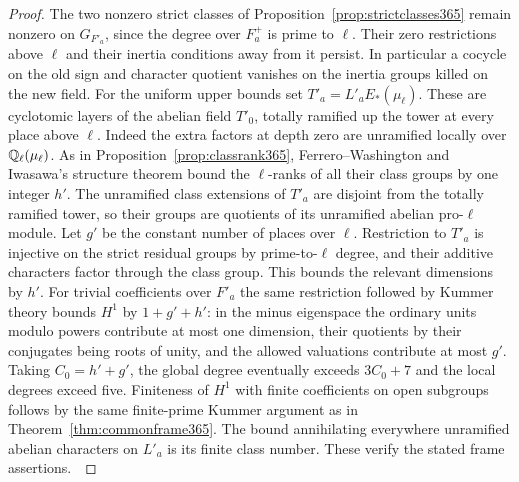 \documentclass[a4paper,11pt]{article}
\theoremstyle{definition}
\theoremstyle{remark}
\numberwithin{equation}{section}
\begin{document}
\begin{proof}
The two nonzero strict classes of Proposition~\ref{prop:strictclasses365}
remain nonzero on \(G_{F'_a}\), since the degree over \(F_a^+\)
is prime to \(\ell\). Their zero restrictions above \(\ell\)
and their inertia conditions away from it persist. In particular
a cocycle on the old sign and character quotient vanishes on
the inertia groups killed on the new field. For the uniform upper
bounds set \(T'_a=L'_aE_*(\mu_\ell)\). These are cyclotomic
layers of the abelian field \(T'_0\), totally ramified up the
tower at every place above \(\ell\). Indeed the extra factors
at depth zero are unramified locally over \(\mathbb Q_\ell(\mu_\ell)\).
As in Proposition~\ref{prop:classrank365}, Ferrero--Washington
and Iwasawa's structure theorem bound the \(\ell\)-ranks of all
their class groups by one integer \(h'\). The unramified class
extensions of \(T'_a\) are disjoint from the totally ramified
tower, so their groups are quotients of its unramified abelian
pro-\(\ell\) module. Let \(g'\) be the constant number of places
over \(\ell\). Restriction to \(T'_a\) is injective on the
strict residual groups by prime-to-\(\ell\) degree, and their
additive characters factor through the class group. This bounds
the relevant dimensions by \(h'\). For trivial coefficients
over \(F'_a\) the same restriction followed by Kummer theory
bounds \(H^1\) by \(1+g'+h'\): in the minus eigenspace the
ordinary units modulo powers contribute at most one dimension,
their quotients by their conjugates being roots of unity, and
the allowed valuations contribute at most \(g'\).
Taking \(C_0=h'+g'\), the global degree eventually exceeds
\(3C_0+7\) and the local degrees exceed five. Finiteness of
\(H^1\) with finite coefficients on open subgroups follows by
the same finite-prime Kummer argument as in
Theorem~\ref{thm:commonframe365}. The bound annihilating
everywhere unramified abelian characters on \(L'_a\) is its
finite class number. These verify the stated frame assertions.
\,\cite{VIII-VI-II-fw13,VIII-VI-II-iwasawa15}


\end{proof}
\end{document}
